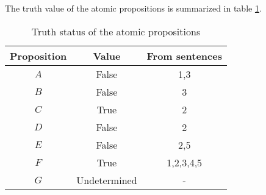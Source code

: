 \documentclass[letterpaper,headings=standardclasses]{scrartcl}
\begin{document}
The truth value of the atomic propositions is summarized in table \ref{tt}.

\begin{table}[h]
    \centering
    \begin{tabular}{|c|c|c|}
    \hline
    Proposition & Value & From sentences \\ \hline
    $A$ & False & 1,3 \\ \hline
    $B$ & False & 3 \\ \hline
    $C$ & True & 2 \\ \hline
    $D$ & False & 2 \\ \hline
    $E$ & False & 2,5 \\ \hline
    $F$ & True & 1,2,3,4,5 \\ \hline
    $G$ & Undetermined & - \\ \hline
    \end{tabular}
    \caption{Truth status of the atomic propositions}
    \label{tt}
\end{table}
\end{document}
